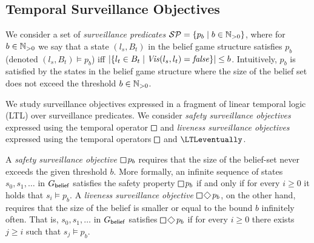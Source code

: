 \subsection{Temporal Surveillance Objectives}
We consider a set of \emph{surveillance predicates} $\mathcal{SP} = \{p_b \mid b \in \mathbb{N}_{>0}\}$, where for $b \in \mathbb{N}_{>0}$ we say that a state $(l_s,B_t)$ in the belief game structure satisfies $p_b$ (denoted $(l_s,B_t) \models p_b$) iff 
$|\{l_t \in B_t  \mid \mathit{Vis}(l_s,l_t)  = \mathit{false} \}| \leq b$.
Intuitively, $p_b$ is satisfied by the states in the belief game structure where the size of the belief set does not exceed the threshold $b \in \mathbb{N}_{>0}$.

We study surveillance objectives expressed in a fragment  of linear temporal logic (LTL) over surveillance predicates.  We consider  \emph{safety surveillance objectives} expressed using the temporal operator $\LTLglobally$ and \emph{liveness surveillance objectives} expressed using the temporal operators $\LTLglobally$ and $\LTLeventually$.

A \emph{safety surveillance objective} $\LTLglobally p_b$ requires that the size of the belief-set never exceeds the given threshold $b$. More formally, an infinite sequence of states $s_0,s_1,\ldots$ in $G_{\mathsf{belief}}$ satisfies the safety property $\LTLglobally p_b$ if and only if for every $i\geq 0$ it holds that $s_i \models p_b$.  A \emph{liveness surveillance objective} $\LTLglobally\LTLfinally p_b$, on the other hand, requires that 
the size of the belief is smaller or equal to the bound $b$  infinitely often. That is, $s_0,s_1,\ldots$ in $G_{\mathsf{belief}}$ satisfies $\LTLglobally\LTLfinally p_b$ if for every $i \geq 0$ there exists $j \geq i$ such that $s_j\models p_b$. 

